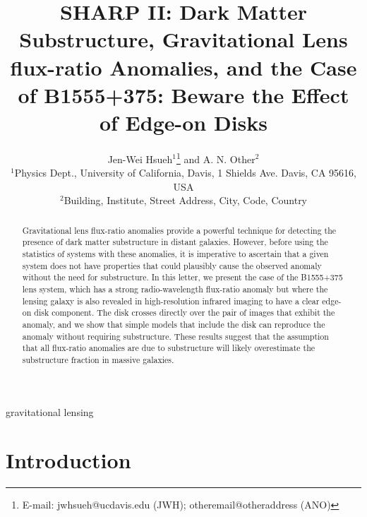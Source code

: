 \documentclass[useAMS,usenatbib]{mn2e}
\title[Beware the Effect of Edge-on Disks]{
SHARP II: Dark Matter Substructure, Gravitational Lens flux-ratio
Anomalies, and the Case of B1555+375: Beware the Effect of Edge-on
Disks
}
\author[Hsueh et al.]{Jen-Wei Hsueh$^{1}$\thanks{E-mail:
jwhsueh@ucdavis.edu (JWH); otheremail@otheraddress (ANO)} and A. N.
Other$^{2}$\\
$^{1}$Physics Dept., University of California, Davis, 1 Shields Ave.
Davis, CA 95616, USA\\
$^{2}$Building, Institute, Street Address, City, Code, Country}
\begin{document}

\pagerange{\pageref{firstpage}--\pageref{lastpage}} 

\maketitle

\label{firstpage}

\begin{abstract}

Gravitational lens flux-ratio anomalies provide a powerful technique
for detecting the presence of dark matter substructure in distant
galaxies.  However, before using the statistics of systems with these
anomalies, it is imperative to ascertain that a given system does not
have properties that could plausibly cause the observed anomaly
without the need for substructure.  In this letter, we present the
case of the B1555+375 lens system, which has a strong radio-wavelength
flux-ratio anomaly but where the lensing galaxy is also revealed in
high-resolution infrared imaging to have a clear edge-on disk component.  The
disk crosses directly over the pair of images that exhibit the
anomaly, and we show that simple models that include the disk can
reproduce the anomaly without requiring substructure.  
These results suggest that the assumption that
all flux-ratio anomalies are due to substructure will likely overestimate
the substructure fraction in massive galaxies.

\end{abstract}

\begin{keywords}
gravitational lensing
\end{keywords}

\section{Introduction}
\end{document}
